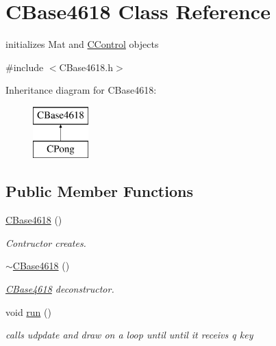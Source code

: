 \hypertarget{class_c_base4618}{}\section{C\+Base4618 Class Reference}
\label{class_c_base4618}


initializes Mat and \hyperlink{class_c_control}{C\+Control} objects  




{\ttfamily \#include $<$C\+Base4618.\+h$>$}

Inheritance diagram for C\+Base4618\+:\begin{figure}[H]
\begin{center}
\leavevmode
\includegraphics[height=2.000000cm]{class_c_base4618}
\end{center}
\end{figure}
\subsection*{Public Member Functions}
\begin{DoxyCompactItemize}
\item 
\hyperlink{class_c_base4618_abe2aad021452c08dd4a5726b44c5a0b7}{C\+Base4618} ()
\begin{DoxyCompactList}\small\item\em Contructor creates. \end{DoxyCompactList}\item 
\hyperlink{class_c_base4618_a22c0de299cef06c4ef49ace3a5b0be52}{$\sim$\+C\+Base4618} ()
\begin{DoxyCompactList}\small\item\em \hyperlink{class_c_base4618}{C\+Base4618} deconstructor. \end{DoxyCompactList}\item 
void \hyperlink{class_c_base4618_a535e816d735d10d6048dd39cd893d393}{run} ()
\begin{DoxyCompactList}\small\item\em calls udpdate and draw on a loop until until it receivs q key \end{DoxyCompactList}\end{DoxyCompactItemize}
